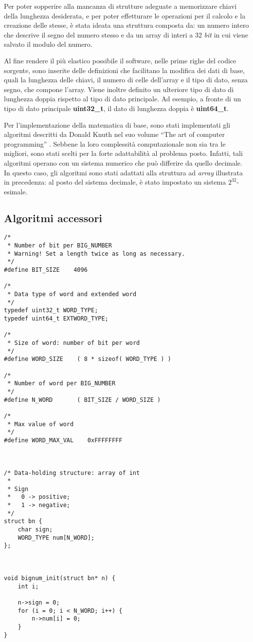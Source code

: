 Per poter sopperire alla mancanza di strutture adeguate a memorizzare chiavi della lunghezza desiderata, e per poter effetturare le operazioni per il calcolo e la creazione delle stesse, è stata ideata una struttura composta da:
 un numero intero che descrive il segno del numero stesso e da un array di interi a 32 \emph{bit} in cui viene salvato il modulo del numero.

Al fine rendere il più elastico possibile il software, nelle prime righe del codice sorgente, sono inserite delle definizioni che facilitano la modifica dei dati di base, quali la lunghezza delle chiavi, il numero di celle dell'array e il tipo di dato, senza segno, che compone l'array. Viene inoltre definito un ulteriore tipo di dato di lunghezza doppia rispetto al tipo di dato principale. Ad esempio, a fronte di un tipo di dato principale \textbf{uint32\_t}, il dato di lunghezza doppia è \textbf{uint64\_t}.

Per l'implementazione della matematica di base, sono stati implementati gli algoritmi descritti da Donald Knuth nel suo volume ``The art of computer programming'' \cite{Knuth}. Sebbene la loro complessità computazionale non sia tra le migliori, sono stati scelti per la forte adattabilità al problema posto. Infatti, tali algoritmi operano con un sistema numerico che può differire da quello decimale. In questo caso, gli algoritmi sono stati adattati alla struttura ad \emph{array} illustrata in precedenza: al posto del sistema decimale, è stato impostato un sistema $2^{32}$-esimale.

%
\subsection{Algoritmi accessori}
%

\begin{lstlisting}[basicstyle=\ttfamily\small, backgroundcolor=\color{bgCode}]
/*
 * Number of bit per BIG_NUMBER
 * Warning! Set a length twice as long as necessary.
 */
#define BIT_SIZE    4096

/*
 * Data type of word and extended word
 */
typedef uint32_t WORD_TYPE;	
typedef uint64_t EXTWORD_TYPE;

/*
 * Size of word: number of bit per word
 */
#define WORD_SIZE    ( 8 * sizeof( WORD_TYPE ) )

/*
 * Number of word per BIG_NUMBER
 */
#define N_WORD       ( BIT_SIZE / WORD_SIZE )

/*
 * Max value of word
 */
#define WORD_MAX_VAL    0xFFFFFFFF



/* Data-holding structure: array of int
 *
 * Sign
 *   0 -> positive;
 *   1 -> negative;
 */
struct bn {
	char sign;
	WORD_TYPE num[N_WORD];
};



void bignum_init(struct bn* n) {
    int i;
    
    n->sign = 0;
    for (i = 0; i < N_WORD; i++) {
        n->num[i] = 0;
    }
}
\end{lstlisting}


